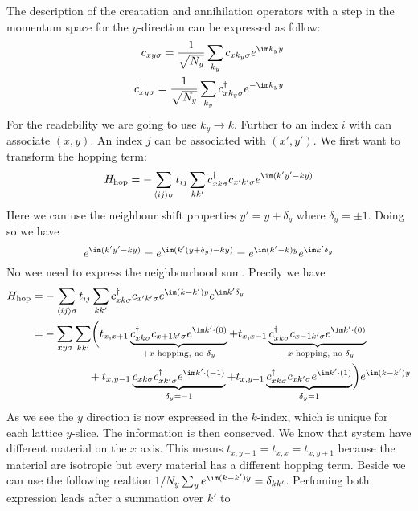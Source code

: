 \documentclass[../main.tex]{subfile}
\begin{document}
The description of the creatation and annihilation operators with a step in the momentum space for the $y$-direction can be expressed as follow:
\begin{align}
    c_{xy\sigma} = \frac{1}{\sqrt{N_y}} \sum_{k_y} c_{x k_y\sigma} e^{\im k_y y} \label{eq:C_Foruier}\\
    c^{\dagger}_{xy\sigma} = \frac{1}{\sqrt{N_y}} \sum_{k_y} c^{\dagger}_{x k_y\sigma} e^{-\im k_y y}\label{eq:C_dagg_Foruier}
\end{align}
For the readebility we are going to use $k_y \rightarrow k$. Further to an index $i$ with can associate $(x,y)$. An index $j$ can be associated with $(x',y')$.
We first want to transform the hopping term:
\begin{equation*}
    H_{\text{hop}} = -\sum_{\langle ij\rangle \sigma} t_{ij} \sum_{kk'} c^{\dagger}_{x k\sigma} c_{x' k'\sigma} e^{\im (k' y' - k y)}
\end{equation*}
Here we can use the neighbour shift properties $y' = y + \delta_y$ where $\delta_y = \pm 1$. Doing so we have 
\[
    e^{\im (k' y' - k y)} = e^{\im (k' (y+\delta_y) -  k y)} = e^{\im (k' -  k)y}e^{\im k'\delta_y}
\]
No wee need to express the neighbourhood sum. Precily we have
\begin{align*}
        H_{\text{hop}} =& -\sum_{\langle ij\rangle \sigma} t_{ij} \sum_{kk'} c^{\dagger}_{x k\sigma} c_{x' k'\sigma}  e^{\im (k -  k')y}e^{\im k'\delta_y}\\
                        =& -\sum_{xy \sigma} \sum_{kk'}  \biggl( t_{x,x+1} \underbrace{c_{x k\sigma}^{\dagger} c_{x+1 k'\sigma}e^{\im k'\cdot (0)}}_{\text{$+x$ hopping, no $\delta_y$}} +  t_{x,x-1} \underbrace{c_{x k\sigma}^{\dagger} c_{x-1 k'\sigma} e^{\im k'\cdot (0)}}_{\text{$-x$ hopping, no $\delta_y$}}\\
                        & ~~~~~~~~~~~~+t_{x,y-1} \underbrace{c_{x k\sigma} c_{x k'\sigma}^{\dagger} e^{\im k'\cdot (-1)}}_{\delta_y = -1} + t_{x,y+1} \underbrace{c_{x k\sigma}^{\dagger} c_{x k'\sigma}e^{\im k'\cdot (1)}}_{\delta_y = 1}\biggr)e^{\im (k -  k')y}
\end{align*}
As we see the $y$ direction is now expressed in the $k$-index, which is unique for each lattice $y$-slice. The information is then conserved. 
We know that system have different material on the $x$ axis. This means $t_{x,y-1} = t_{x,x} = t_{x,y+1}$ because the material are isotropic but every material has a 
different hopping term. Beside we can use the following realtion $1/N_y \sum_{y} e^{\im (k -  k')y} = \delta_{kk'}$. Perfoming both expression leads after a summation over $k'$ to
\end{document}
